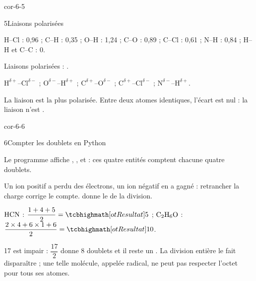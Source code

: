 \begin{blocLivre}{cor-6-5}
\begin{corrige}{5}{Liaisons polarisées}
\begin{questions}
\item H--Cl : 0,96 ; C--H : 0,35 ; O--H : 1,24 ; C--O : 0,89 ; C--Cl : 0,61 ; N--H : 0,84 ; H--H et C--C : 0.
\item Liaisons polarisées : .
\item $\mathrm{H}^{\delta+}$--$\mathrm{Cl}^{\delta-}$ ; $\mathrm{O}^{\delta-}$--$\mathrm{H}^{\delta+}$ ; $\mathrm{C}^{\delta+}$--$\mathrm{O}^{\delta-}$ ; $\mathrm{C}^{\delta+}$--$\mathrm{Cl}^{\delta-}$ ; $\mathrm{N}^{\delta-}$--$\mathrm{H}^{\delta+}$.
\item La liaison  est la plus polarisée. Entre deux atomes identiques, l'écart est nul : la liaison n'est
.
\end{questions}
\end{corrige}
\end{blocLivre}
\begin{blocLivre}{cor-6-6}
\begin{corrige}{6}{Compter les doublets en Python}
\begin{questions}
\item Le programme affiche , ,  et  : ces quatre entités comptent chacune quatre doublets.
\item Un ion positif a perdu des électrons, un ion négatif en a gagné : retrancher la charge corrige le compte.
\code{//} donne le  de la division.
\item $\ce{HCN}$ : $\dfrac{1+4+5}{2}=\res{5}$ ; $\ce{C2H6O}$ : $\dfrac{2\times4+6\times1+6}{2}=\res{10}$.
\item 17 est impair : $\dfrac{17}{2}$ donne 8 doublets et il reste un . La division entière le fait
disparaître ; une telle molécule, appelée radical, ne peut pas respecter l'octet pour tous ses atomes.
\end{questions}
\end{corrige}
\end{blocLivre}
